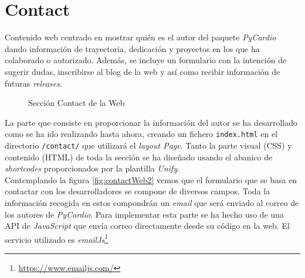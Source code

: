 
\section{Contact}
\label{sec:contactWeb}
Contenido web centrado en mostrar quién es el autor del paquete \textit{PyCardio} dando información de trayectoria, dedicación y proyectos en los que ha colaborado o autorizado. Además, se incluye un formulario con la intención de sugerir dudas, inscribirse al blog de la web y así como recibir información de futuras \textit{releases}.

\begin{figure}[H]
    \centering
    \caption{Sección Contact de la Web}
    \label{fig:contactWeb}
\end{figure}


La parte que consiste en proporcionar la información del autor se ha desarrollado como se ha ido realizando hasta ahora, creando un fichero \texttt{index.html} en el directorio \texttt{/contact/} que utilizará el \textit{layout Page}. Tanto la parte visual (CSS) y contenido (HTML) de toda la sección se ha diseñado usando el abanico de \textit{shortcodes} proporcionados por la plantilla \textit{Unify}. \\

Contemplando la figura  \ref{fig:contactWeb2} vemos que el formulario que se basa en contactar con los desarrolladores se compone de diversos campos. Toda la información recogida en estos compondrán un \textit{email} que será enviado al correo de los autores de \textit{PyCardio}. Para implementar esta parte se ha hecho uso de una API de \textit{JavaScript} que envía correo directamente desde su código en la web. El servicio utilizado es \textit{emailJs}\footnote{\url{https://www.emailjs.com/}}

